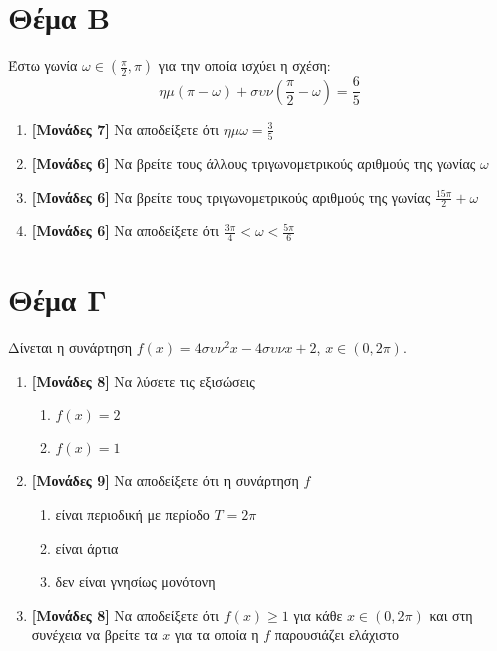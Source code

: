\documentclass[12pt]{article}
\begin{document}
\section*{Θέμα Β}
\noindent
Έστω γωνία $ω\in\left( \frac{π}{2},π \right)$ για την οποία ισχύει η σχέση:
$$ημ(π-ω)+συν(\frac{π}{2}-ω)=\frac{6}{5}$$
\begin{enumerate}
      \item \textbf{[Μονάδες 7]} Να αποδείξετε ότι $ημω=\frac{3}{5}$
      \item \textbf{[Μονάδες 6]} Να βρείτε τους άλλους τριγωνομετρικούς αριθμούς της γωνίας $ω$
      \item \textbf{[Μονάδες 6]} Να βρείτε τους τριγωνομετρικούς αριθμούς της γωνίας $\frac{15π}{2}+ω$
      \item \textbf{[Μονάδες 6]} Να αποδείξετε ότι $\frac{3π}{4}<ω<\frac{5π}{6}$
\end{enumerate}

\section*{Θέμα Γ}
\noindent
Δίνεται η συνάρτηση $f(x)=4συν^2x-4συνx+2$, $x\in (0,2π)$.
\begin{enumerate}
      \item \textbf{[Μονάδες 8]} Να λύσετε τις εξισώσεις
            \begin{multicols}{2}
                  \begin{enumerate}[label=(\roman*).]
                        \item $f(x)=2$
                        \item $f(x)=1$
                  \end{enumerate}
            \end{multicols}
      \item \textbf{[Μονάδες 9]} Να αποδείξετε ότι η συνάρτηση $f$
            \begin{enumerate}[label=\roman*.]
                  \item είναι περιοδική με περίοδο $Τ=2π$
                  \item είναι άρτια
                  \item δεν είναι γνησίως μονότονη
            \end{enumerate}
      \item \textbf{[Μονάδες 8]} Να αποδείξετε ότι $f(x)\ge 1$ για κάθε $x\in (0,2π)$ και στη συνέχεια να βρείτε τα $x$ για τα οποία η $f$ παρουσιάζει ελάχιστο
\end{enumerate}
\end{document}
